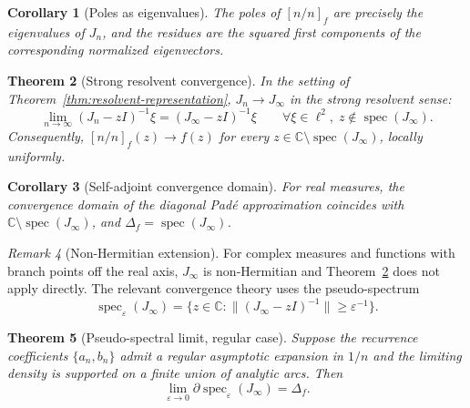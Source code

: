 \documentclass[11pt]{article}
\newtheorem{theorem}{Theorem}[section]
\newtheorem{corollary}[theorem]{Corollary}
\theoremstyle{definition}
\theoremstyle{remark}
\newtheorem{remark}[theorem]{Remark}
\DeclareMathOperator{\spec}{spec}
\begin{document}
\begin{corollary}[Poles as eigenvalues]
\label{cor:poles-eigenvalues}
The poles of $[n/n]_{f}$ are precisely the eigenvalues of $J_{n}$, and the residues are the squared first components of the corresponding normalized eigenvectors.
\end{corollary}

\begin{theorem}[Strong resolvent convergence]
\label{thm:strong-resolvent}
In the setting of Theorem~\ref{thm:resolvent-representation}, $J_{n}\to J_{\infty}$ in the strong resolvent sense:
\begin{equation}
\lim_{n\to\infty}(J_{n}-zI)^{-1}\xi=(J_{\infty}-zI)^{-1}\xi
\qquad\forall\xi\in\ell^{2},\;z\notin\spec(J_{\infty}).
\label{eq:strong-resolvent}
\end{equation}
Consequently, $[n/n]_{f}(z)\to f(z)$ for every $z\in\mathbb{C}\setminus\spec(J_{\infty})$, locally uniformly.
\end{theorem}

\begin{corollary}[Self-adjoint convergence domain]
\label{cor:sa-domain}
For real measures, the convergence domain of the diagonal Pad\'e approximation coincides with $\mathbb{C}\setminus\spec(J_{\infty})$, and $\Delta_{f}=\spec(J_{\infty})$.
\end{corollary}

\begin{remark}[Non-Hermitian extension]
\label{rem:non-hermitian}
For complex measures and functions with branch points off the real axis, $J_{\infty}$ is non-Hermitian and Theorem~\ref{thm:strong-resolvent} does not apply directly. The relevant convergence theory uses the pseudo-spectrum
\begin{equation}
\spec_{\varepsilon}(J_{\infty})=\bigl\{z\in\mathbb{C}:\bigl\|(J_{\infty}-zI)^{-1}\bigr\|\ge\varepsilon^{-1}\bigr\}.
\label{eq:pseudospectrum}
\end{equation}
\end{remark}

\begin{theorem}[Pseudo-spectral limit, regular case]
\label{thm:pseudo-limit}
Suppose the recurrence coefficients $\{a_{n},b_{n}\}$ admit a regular asymptotic expansion in $1/n$ and the limiting density is supported on a finite union of analytic arcs. Then
\begin{equation}
\lim_{\varepsilon\to 0}\partial\spec_{\varepsilon}(J_{\infty})=\Delta_{f}.
\label{eq:pseudo-limit}
\end{equation}
\end{theorem}
\end{document}
